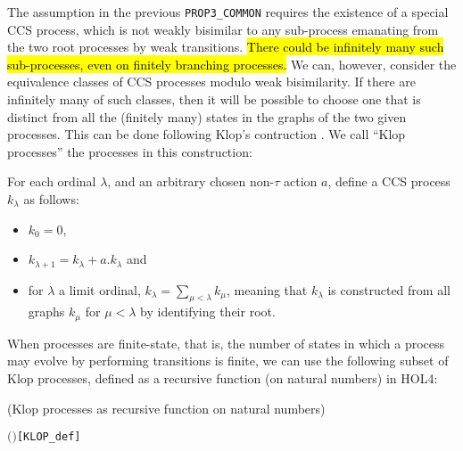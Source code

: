 The assumption in the previous \texttt{PROP3_COMMON} requires the
existence of a special CCS process, which is not weakly bisimilar to
any sub-process emanating from the two root processes by weak
transitions.
\hl{There could be infinitely many such sub-processes, even on finitely
branching processes.}
We can, however, consider the equivalence classes of CCS processes
modulo weak bisimilarity.
If there are infinitely many of such classes, 
then it will be 
possible to choose one  that is distinct from all the (finitely many) states in the
graphs of the two given processes.  
This can be done following Klop's contruction \cite{van2005characterisation}.
 We call  ``Klop processes''  the processes in this construction:
\begin{definition}
For each ordinal $\lambda$, and an arbitrary chosen non-$\tau$ action $a$,
define a CCS process $k_\lambda$ as follows:
\begin{itemize}
\item $k_0 = 0$,
\item $k_{\lambda+1} = k_\lambda + a.k_\lambda$ and
\item for $\lambda$ a limit ordinal, $k_\lambda = \sum_{\mu < \lambda}
  k_\mu$, meaning that $k_\lambda$ is constructed from all graphs
  $k_\mu$ for $\mu < \lambda$ by identifying their root.
\end{itemize}
\end{definition}
When processes are finite-state, that is,
the number of  states in which a process may evolve by performing
transitions is finite, 
we can use  the following subset of Klop processes, 
defined as a recursive function (on natural numbers) in HOL4:
\begin{definition}{(Klop processes as recursive function on natural numbers)}
\begin{alltt}
   \HOLSymConst{\HOLTokenDefEquality{}} 
  \ensuremath{(} \ensuremath{)} \HOLSymConst{\HOLTokenDefEquality{}}    \HOLSymConst{\ensuremath{+}}  \HOLSymConst{\ensuremath{\ldotp}}  \hfill{[KLOP_def]}
\end{alltt}
\end{definition}

